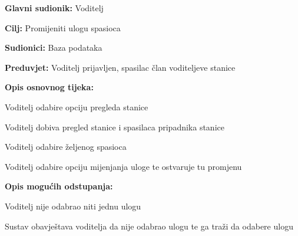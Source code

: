 					\noindent {}
					\begin{packed_item}
	
						\item \textbf{Glavni sudionik: }\text Voditelj
						\item  \textbf{Cilj:} \text Promijeniti ulogu spasioca
						\item  \textbf{Sudionici:} \text Baza podataka
						\item  \textbf{Preduvjet:} \text Voditelj prijavljen, spasilac član voditeljeve stanice
						\item  \textbf{Opis osnovnog tijeka:}
						
						\item[] \begin{packed_enum}
	
							\item \text Voditelj odabire opciju pregleda stanice
							\item \text Voditelj dobiva pregled stanice i spasilaca pripadnika stanice
							\item \text Voditelj odabire željenog spasioca
							\item \text Voditelj odabire opciju mijenjanja uloge te ostvaruje tu promjenu
					
						\end{packed_enum}

						\item  \textbf{Opis mogućih odstupanja:}
						
						\item[] \begin{packed_item}
	
							\item[4.a] \text Voditelj nije odabrao niti jednu ulogu
							\item[] \begin{packed_item}
								
								\item \text Sustav obavještava voditelja da nije odabrao ulogu te ga traži da odabere ulogu
								
							\end{packed_item}
							
						\end{packed_item}
						
					\end{packed_item}

